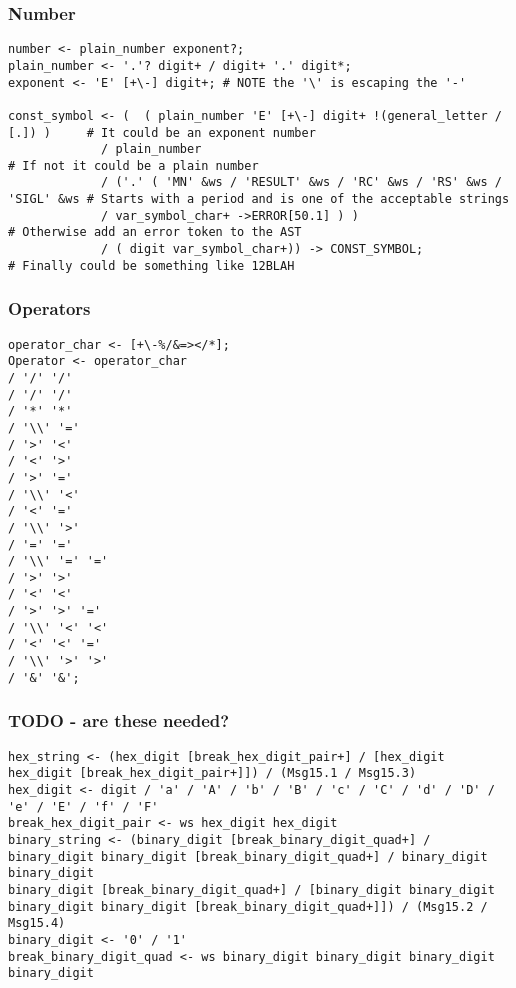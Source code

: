 \subsubsection{Number}

\begin{verbatim}
number <- plain_number exponent?;
plain_number <- '.'? digit+ / digit+ '.' digit*;
exponent <- 'E' [+\-] digit+; # NOTE the '\' is escaping the '-'

const_symbol <- (  ( plain_number 'E' [+\-] digit+ !(general_letter / [.]) )     # It could be an exponent number
             / plain_number                                                      # If not it could be a plain number
             / ('.' ( 'MN' &ws / 'RESULT' &ws / 'RC' &ws / 'RS' &ws / 'SIGL' &ws # Starts with a period and is one of the acceptable strings
             / var_symbol_char+ ->ERROR[50.1] ) )                                # Otherwise add an error token to the AST
             / ( digit var_symbol_char+)) -> CONST_SYMBOL;                       # Finally could be something like 12BLAH
\end{verbatim}

\subsubsection{Operators}

\begin{verbatim}
operator_char <- [+\-%/&=></*];
Operator <- operator_char 
/ '/' '/'
/ '/' '/' 
/ '*' '*' 
/ '\\' '='
/ '>' '<' 
/ '<' '>' 
/ '>' '='
/ '\\' '<' 
/ '<' '=' 
/ '\\' '>'
/ '=' '=' 
/ '\\' '=' '='
/ '>' '>' 
/ '<' '<'
/ '>' '>' '='
/ '\\' '<' '<'
/ '<' '<' '='
/ '\\' '>' '>'
/ '&' '&';	
\end{verbatim}

\subsubsection{TODO - are these needed?}

\begin{verbatim}
hex_string <- (hex_digit [break_hex_digit_pair+] / [hex_digit hex_digit [break_hex_digit_pair+]]) / (Msg15.1 / Msg15.3)
hex_digit <- digit / 'a' / 'A' / 'b' / 'B' / 'c' / 'C' / 'd' / 'D' / 'e' / 'E' / 'f' / 'F'
break_hex_digit_pair <- ws hex_digit hex_digit
binary_string <- (binary_digit [break_binary_digit_quad+] / binary_digit binary_digit [break_binary_digit_quad+] / binary_digit binary_digit         
binary_digit [break_binary_digit_quad+] / [binary_digit binary_digit binary_digit binary_digit [break_binary_digit_quad+]]) / (Msg15.2 / Msg15.4)
binary_digit <- '0' / '1' 
break_binary_digit_quad <- ws binary_digit binary_digit binary_digit binary_digit
\end{verbatim}

